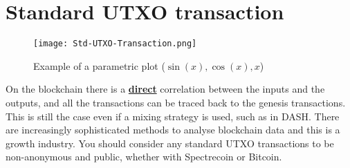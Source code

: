 \section{Standard UTXO transaction}

\begin{figure}[h]
	\caption{Example of a parametric plot ($\sin (x), \cos(x), x$)}
	\centering
	\texttt{[image: Std-UTXO-Transaction.png]}
\end{figure}

On the blockchain there is a \textbf{\underline{direct}} correlation 
between the inputs and the
outputs, and all the transactions can be traced back to the genesis
transactions. This is still the case even if a mixing strategy is used,
such as in DASH. There are increasingly sophisticated methods to analyse
blockchain data and this is a growth industry. You should consider any
standard UTXO transactions to be non-anonymous and public, whether with
Spectrecoin or Bitcoin.
